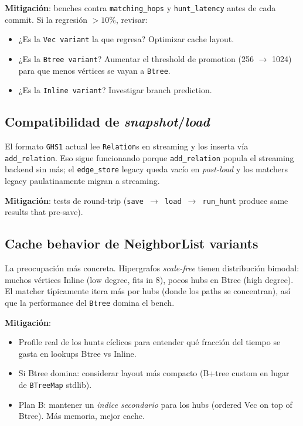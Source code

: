 \textbf{Mitigación}: benches contra \texttt{matching\_hops} y
\texttt{hunt\_latency} antes de cada commit. Si la regresión
\(> 10\%\), revisar:

\begin{itemize}
    \item ¿Es la \texttt{Vec variant} la que regresa? Optimizar
    cache layout.
    \item ¿Es la \texttt{Btree variant}? Aumentar el threshold
    de promotion (256 $\to$ 1024) para que menos vértices se
    vayan a \texttt{Btree}.
    \item ¿Es la \texttt{Inline variant}? Investigar
    branch prediction.
\end{itemize}

\subsection{Compatibilidad de \emph{snapshot}/\emph{load}}

El formato \texttt{GHS1} actual lee \texttt{Relation}s en
streaming y los inserta vía \texttt{add\_relation}. Eso sigue
funcionando porque \texttt{add\_relation} popula el streaming
backend sin más; el \texttt{edge\_store} legacy queda vacío en
\emph{post-load} y los matchers legacy paulatinamente migran a
streaming.

\textbf{Mitigación}: tests de round-trip
(\texttt{save $\to$ load $\to$ run\_hunt} produce same results
that pre-save).

\subsection{Cache behavior de NeighborList variants}

La preocupación más concreta. Hipergrafos \emph{scale-free} tienen
distribución bimodal: muchos vértices Inline (low degree, fits in
8), pocos hubs en Btree (high degree). El matcher típicamente
itera más por hubs (donde los paths se concentran), así que la
performance del \texttt{Btree} domina el bench.

\textbf{Mitigación}:
\begin{itemize}
    \item Profile real de los hunts cíclicos para entender qué
    fracción del tiempo se gasta en lookups Btree vs Inline.
    \item Si Btree domina: considerar layout más compacto (B+tree
    custom en lugar de \texttt{BTreeMap} stdlib).
    \item Plan B: mantener un \emph{indice secondario} para los
    hubs (ordered Vec on top of Btree). Más memoria, mejor cache.
\end{itemize}

